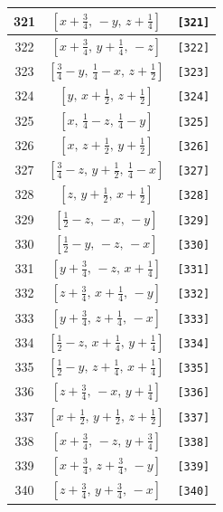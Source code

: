 \documentclass[fleqn,8pt]{jsarticle}
\begin{document}
\begin{longtable}{ccc}
321 & $\left[ x + \frac{3}{4},\, - y,\, z + \frac{1}{4} \right]$ & {\tt [321]} \\ \hline
322 & $\left[ x + \frac{3}{4},\, y + \frac{1}{4},\, - z \right]$ & {\tt [322]} \\ \hline
323 & $\left[ \frac{3}{4} - y,\, \frac{1}{4} - x,\, z + \frac{1}{2} \right]$ & {\tt [323]} \\ \hline
324 & $\left[ y,\, x + \frac{1}{2},\, z + \frac{1}{2} \right]$ & {\tt [324]} \\ \hline
325 & $\left[ x,\, \frac{1}{4} - z,\, \frac{1}{4} - y \right]$ & {\tt [325]} \\ \hline
326 & $\left[ x,\, z + \frac{1}{2},\, y + \frac{1}{2} \right]$ & {\tt [326]} \\ \hline
327 & $\left[ \frac{3}{4} - z,\, y + \frac{1}{2},\, \frac{1}{4} - x \right]$ & {\tt [327]} \\ \hline
328 & $\left[ z,\, y + \frac{1}{2},\, x + \frac{1}{2} \right]$ & {\tt [328]} \\ \hline
329 & $\left[ \frac{1}{2} - z,\, - x,\, - y \right]$ & {\tt [329]} \\ \hline
330 & $\left[ \frac{1}{2} - y,\, - z,\, - x \right]$ & {\tt [330]} \\ \hline
331 & $\left[ y + \frac{3}{4},\, - z,\, x + \frac{1}{4} \right]$ & {\tt [331]} \\ \hline
332 & $\left[ z + \frac{3}{4},\, x + \frac{1}{4},\, - y \right]$ & {\tt [332]} \\ \hline
333 & $\left[ y + \frac{3}{4},\, z + \frac{1}{4},\, - x \right]$ & {\tt [333]} \\ \hline
334 & $\left[ \frac{1}{2} - z,\, x + \frac{1}{4},\, y + \frac{1}{4} \right]$ & {\tt [334]} \\ \hline
335 & $\left[ \frac{1}{2} - y,\, z + \frac{1}{4},\, x + \frac{1}{4} \right]$ & {\tt [335]} \\ \hline
336 & $\left[ z + \frac{3}{4},\, - x,\, y + \frac{1}{4} \right]$ & {\tt [336]} \\ \hline
337 & $\left[ x + \frac{1}{2},\, y + \frac{1}{2},\, z + \frac{1}{2} \right]$ & {\tt [337]} \\ \hline
338 & $\left[ x + \frac{3}{4},\, - z,\, y + \frac{3}{4} \right]$ & {\tt [338]} \\ \hline
339 & $\left[ x + \frac{3}{4},\, z + \frac{3}{4},\, - y \right]$ & {\tt [339]} \\ \hline
340 & $\left[ z + \frac{3}{4},\, y + \frac{3}{4},\, - x \right]$ & {\tt [340]} \\ \hline

\end{longtable}
\end{document}
